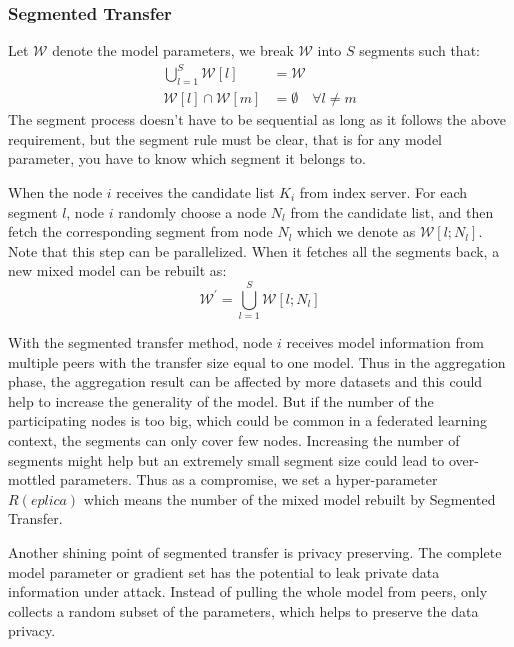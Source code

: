 \subsubsection{Segmented Transfer}
Let $\mathcal{W}$ denote the model parameters, we break $\mathcal{W}$ into $S$ segments such that:
\begin{equation}
    \begin{split}
        \bigcup_{l = 1}^{S} \mathcal{W}[l] &= \mathcal{W} \\
        \mathcal{W}[l] \cap  \mathcal{W}[m] &= \emptyset \quad \forall l\neq m
    \end{split}
\end{equation}
The segment process doesn't have to be sequential as long as it follows the above requirement, but the segment rule must be clear, that is for any model parameter, you have to know which segment it belongs to. 

When the node $i$ receives the candidate list $K_i$ from index server. For each segment $l$, node $i$ randomly choose a node $N_l$ from the candidate list, and then fetch the corresponding segment from node $N_l$ which we denote as $\mathcal{W}[l;N_l]$. Note that this step can be parallelized. When it fetches all the segments back, a new mixed model can be rebuilt as:
\begin{equation}
    \mathcal{W}^\prime = \bigcup_{l = 1}^{S} \mathcal{W}[l;N_l] \label{eq:seg_union}
\end{equation}

With the segmented transfer method, node $i$ receives model information from multiple peers with the transfer size equal to one model. Thus in the aggregation phase, the aggregation result can be affected by more datasets and this could help to increase the generality of the model. But if the number of the participating nodes is too big, which could be common in a federated learning context, the segments can only cover few nodes. Increasing the number of segments might help but an extremely small segment size could lead to over-mottled parameters. Thus as a compromise, we set a hyper-parameter $R(eplica)$ which means the number of the mixed model rebuilt by Segmented Transfer. 

Another shining point of segmented transfer is privacy preserving. The complete model parameter or gradient set has the potential to leak private data information under attack. Instead of pulling the whole model from peers, \sys only collects a random subset of the parameters, which helps to preserve the data privacy. 


